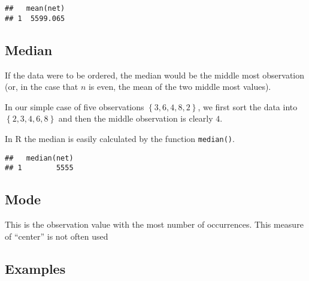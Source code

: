 \documentclass[]{book}
\newenvironment{Shaded}{\begin{snugshade}}{\end{snugshade}}
\newcommand{\KeywordTok}[1]{\textcolor[rgb]{0.13,0.29,0.53}{\textbf{{#1}}}}
\newcommand{\StringTok}[1]{\textcolor[rgb]{0.31,0.60,0.02}{{#1}}}
\newcommand{\CommentTok}[1]{\textcolor[rgb]{0.56,0.35,0.01}{\textit{{#1}}}}
\newcommand{\NormalTok}[1]{{#1}}
\begin{document}
\begin{Shaded}
\end{Shaded}

\begin{verbatim}
##   mean(net)
## 1  5599.065
\end{verbatim}

\subsection{Median}\label{median}

If the data were to be ordered, the median would be the middle most
observation (or, in the case that \(n\) is even, the mean of the two
middle most values).

In our simple case of five observations \(\left\{ 3,6,4,8,2\right\}\),
we first sort the data into \(\left\{ 2,3,4,6,8\right\}\) and then the
middle observation is clearly \(4\).

In R the median is easily calculated by the function \texttt{median()}.

\begin{Shaded}
\end{Shaded}

\begin{verbatim}
##   median(net)
## 1        5555
\end{verbatim}

\subsection{Mode}\label{mode}

This is the observation value with the most number of occurrences. This
measure of ``center'' is not often used

\subsection{Examples}\label{examples}
\end{document}
